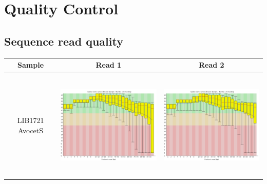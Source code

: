 \chapter[Quality control]{Quality Control}

\section{Sequence read quality}
 \label{App:AppendixQCRead}
 
\begin{center}
\begin{tabular}{ccc}
\toprule
Sample  & Read 1 & Read 2 \\ \midrule 
\\
\begin{sideways}LIB1721 AvocetS\end{sideways} & \includegraphics[height=5cm]{Appendices/images/Sample_LIB1721_base_quality_R1.png} & \includegraphics[height=5cm]{Appendices/images/Sample_LIB1721_base_quality_R2.png} \\ \midrule  \\

\end{tabular}
\end{center}
